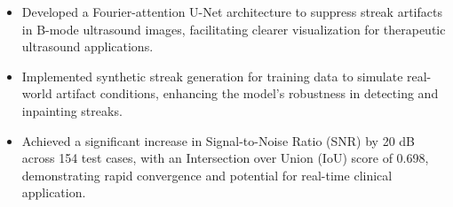 \documentclass[a4paper,11pt]{cdsTemp}
\begin{document}
\begin{itemize}
    \item Developed a Fourier-attention U-Net architecture to suppress streak artifacts in B-mode ultrasound images, facilitating clearer visualization for therapeutic ultrasound applications.
    \item Implemented synthetic streak generation for training data to simulate real-world artifact conditions, enhancing the model's robustness in detecting and inpainting streaks.
    \item Achieved a significant increase in Signal-to-Noise Ratio (SNR) by 20 dB across 154 test cases, with an Intersection over Union (IoU) score of 0.698, demonstrating rapid convergence and potential for real-time clinical application.
\end{itemize}



\end{document}
